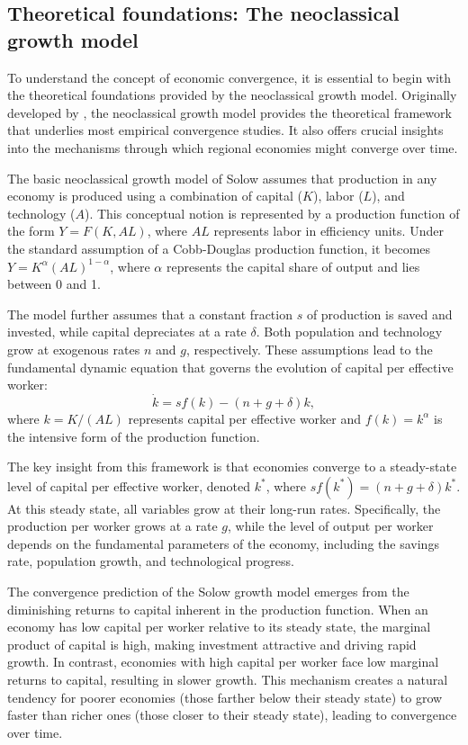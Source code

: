 \documentclass[smallextended, natbib]{svjour3}       %
\begin{document}
\subsection{Theoretical foundations: The neoclassical growth model}

To understand the concept of economic convergence, it is essential to begin with the theoretical foundations provided by the neoclassical growth model.
Originally developed by \cite{solow1956contribution}, the neoclassical growth model provides the theoretical framework that underlies most empirical convergence studies.
It also offers crucial insights into the mechanisms through which regional economies might converge over time.

The basic neoclassical growth model of Solow assumes that production in any economy is produced using a combination of capital ($K$), labor ($L$), and technology ($A$).
This conceptual notion is represented by a production function of the form $Y = F(K, AL)$, where $AL$ represents labor in efficiency units. 
Under the standard assumption of a Cobb-Douglas production function, it becomes $Y = K^\alpha (AL)^{1-\alpha}$, where $\alpha$ represents the capital share of output and lies between 0 and 1.

The model further assumes that a constant fraction $s$ of production is saved and invested, while capital depreciates at a rate $\delta$.
Both population and technology grow at exogenous rates $n$ and $g$, respectively. 
These assumptions lead to the fundamental dynamic equation that governs the evolution of capital per effective worker:
\begin{equation}
\dot{k} = sf(k) - (n + g + \delta)k,
\end{equation}
\noindent where $k = K/(AL)$ represents capital per effective worker and $f(k) = k^\alpha$ is the intensive form of the production function.

The key insight from this framework is that economies converge to a steady-state level of capital per effective worker, denoted $k^*$, where $sf(k^*) = (n + g + \delta)k^*$. 
At this steady state, all variables grow at their long-run rates.
Specifically, the production per worker grows at a rate $g$, while the level of output per worker depends on the fundamental parameters of the economy, including the savings rate, population growth, and technological progress.

The convergence prediction of the Solow growth model emerges from the diminishing returns to capital inherent in the production function. 
When an economy has low capital per worker relative to its steady state, the marginal product of capital is high, making investment attractive and driving rapid growth. 
In contrast, economies with high capital per worker face low marginal returns to capital, resulting in slower growth. 
This mechanism creates a natural tendency for poorer economies (those farther below their steady state) to grow faster than richer ones (those closer to their steady state), leading to convergence over time.
\end{document}
